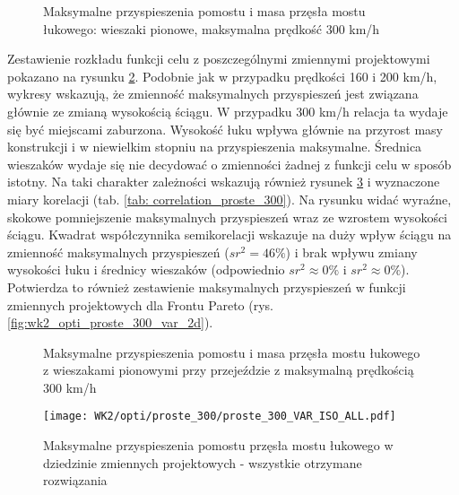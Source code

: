 \begin{figure}[hbt!]
	\centering
	\captionsetup{justification=centering}
	\caption{Maksymalne przyspieszenia pomostu i masa przęsła mostu łukowego: wieszaki pionowe, maksymalna prędkość 300 km/h}
	\label{fig:wk2_opti_proste_300_all}
\end{figure}

Zestawienie rozkładu funkcji celu z poszczególnymi zmiennymi projektowymi pokazano na rysunku \ref{fig:wk2_opti_proste_300_variables}. Podobnie jak w przypadku prędkości 160 i 200 km/h, wykresy wskazują, że zmienność maksymalnych przyspieszeń jest związana głównie ze zmianą wysokością ściągu. W przypadku 300 km/h relacja ta wydaje się być miejscami zaburzona. Wysokość łuku wpływa głównie na przyrost masy konstrukcji i w niewielkim stopniu na przyspieszenia maksymalne. Średnica wieszaków wydaje się nie decydować o zmienności żadnej z funkcji celu w sposób istotny. Na taki charakter zależności wskazują również rysunek \ref{fig:wk2_opti_proste_300_vars_all} i wyznaczone miary korelacji (tab. \ref{tab: correlation_proste_300}). Na rysunku widać wyraźne, skokowe pomniejszenie maksymalnych przyspieszeń wraz ze wzrostem wysokości ściągu. Kwadrat współczynnika semikorelacji wskazuje na duży wpływ ściągu na zmienność maksymalnych przyspieszeń ($sr^2=46\%$) i brak wpływu zmiany wysokości łuku i średnicy wieszaków (odpowiednio $sr^2\approx 0\%$ i $sr^2\approx 0\%$). Potwierdza to również zestawienie maksymalnych przyspieszeń w funkcji zmiennych projektowych dla Frontu Pareto (rys. \ref{fig:wk2_opti_proste_300_var_2d}). 

\begin{figure}[hbt!]
	\centering
	\captionsetup{justification=centering}
	\caption{Maksymalne przyspieszenia pomostu i masa przęsła mostu łukowego z wieszakami pionowymi przy przejeździe z maksymalną prędkością 300 km/h}
	\label{fig:wk2_opti_proste_300_variables}
\end{figure}
\begin{figure}[hbt!]
	\centering
	\texttt{[image: WK2/opti/proste\_300/proste\_300\_VAR\_ISO\_ALL.pdf]}
	\captionsetup{justification=centering}
	\caption{Maksymalne przyspieszenia pomostu przęsła mostu łukowego w dziedzinie zmiennych projektowych - wszystkie otrzymane rozwiązania}
	\label{fig:wk2_opti_proste_300_vars_all}
\end{figure}

